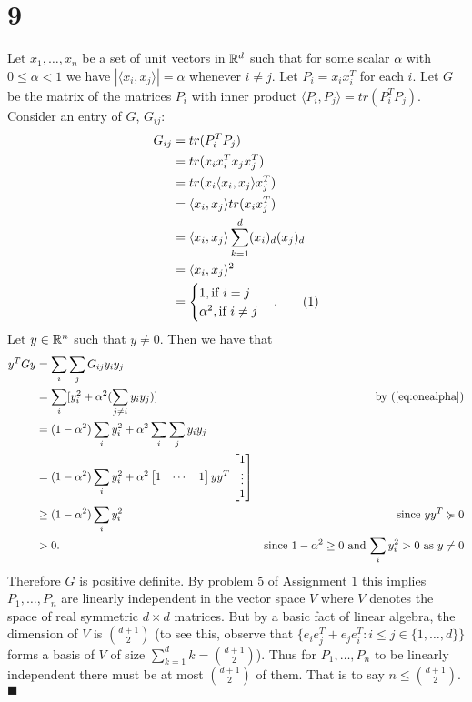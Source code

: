 \documentclass[letterpaper,12pt,oneside,onecolumn]{article}
\newcommand\numberthis{\addtocounter{equation}{1}\tag{\theequation}}
\begin{document}
\section*{9}
Let $x_1, \dots, x_n$ be a set of unit vectors in $\mathbb{R}^d$ such that for some scalar $\alpha$ with $0 \leq \alpha < 1$ we have $|\langle x_i, x_j \rangle | = \alpha$ whenever $i \neq j$. Let $P_i = x_i x_i^T$ for each $i$. Let $G$ be the matrix of the matrices $P_i$ with inner product $\langle P_i, P_j \rangle = tr(P_i^T P_j)$. Consider an entry of $G$, $G_{ij}$:
\begin{align*}
G_{ij} &= tr(P_i^T P_j) \\
&= tr(x_i x_i^T x_j x_j^T) \\
&= tr(x_i \langle x_i, x_j \rangle x_j^T) \\
&= \langle x_i, x_j \rangle tr(x_i x_j^T) \\
&= \langle x_i, x_j \rangle \sum_{k=1}^d (x_i)_d (x_j)_d \\
&= \langle x_i, x_j \rangle ^2\\
&= \begin{cases}
1, \text{if $i=j$}\\
\alpha^2, \text{if $i \neq j$}
\end{cases}. \numberthis \label{eq:onealpha}
\end{align*}
Let $y \in \mathbb{R}^n$ such that $y \neq 0$. Then we have that
\begin{align*}
y^TGy &= \sum_{i} \sum_{j} G_{ij} y_i y_j\\
&= \sum_{i} [y_i^2 + \alpha^2(\sum_{j \neq i} y_iy_j)] &\text{by (\ref{eq:onealpha})}\\
&= (1-\alpha^2)\sum_{i}y_i^2 + \alpha^2\sum_i\sum_j y_iy_j \\
&=(1-\alpha^2)\sum_i y_i^2 + \alpha^2 \begin{bmatrix}1 & \cdots & 1 \end{bmatrix}yy^T\begin{bmatrix}1\\\vdots\\1\end{bmatrix} \\
&\geq (1-\alpha^2)\sum_i y_i^2 &\text{since $yy^T \succcurlyeq 0$} \\
&> 0. &\text{since $1-\alpha^2\geq 0$ and $\sum_i y_i^2 >0$ as $y \neq 0$}
\end{align*}
Therefore $G$ is positive definite. By problem $5$ of Assignment $1$ this implies $P_1, \dots, P_n$ are linearly independent in the vector space $V$ where $V$ denotes the space of real symmetric $d \times d$ matrices. But by a basic fact of linear algebra, the dimension of $V$ is $d+1 \choose 2$ (to see this, observe that $\{e_ie_j^T + e_je_i^T : i \leq j \in \{1,\dots,d\}\}$ forms a basis of $V$ of size $\sum_{k=1}^d k = $$d+1\choose 2$). Thus for $P_1, \dots, P_n$ to be linearly independent there must be at most $d+1 \choose 2$ of them. That is to say $n \leq $$d+1 \choose 2$. $\blacksquare$
\end{document}
